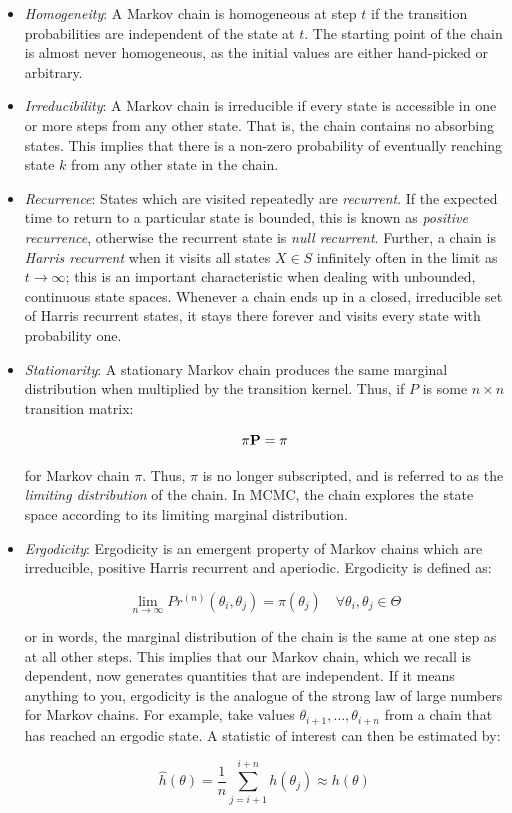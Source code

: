 \documentclass[]{book}
\begin{document}
\begin{itemize}
\item \emph{Homogeneity}: A Markov chain is homogeneous at step $t$ if the transition probabilities are independent of the state at $t$. The starting point of the chain is almost never homogeneous, as the initial values are either hand-picked or arbitrary.
\item \emph{Irreducibility}: A Markov chain is irreducible if every state is accessible in one or more steps from any other state. That is, the chain contains no absorbing states. This implies that there is a non-zero probability of eventually reaching state $k$ from any other state in the chain.
\item \emph{Recurrence}: States which are visited repeatedly are \emph{recurrent}. If the expected time to return to a particular state is bounded, this is known as \emph{positive recurrence}, otherwise the recurrent state is \emph{null recurrent}. Further, a chain is \emph{Harris recurrent} when it visits all states $X \in S$ infinitely often in the limit as $t \to \infty$; this is an important characteristic when dealing with unbounded, continuous state spaces. Whenever a chain ends up in a closed, irreducible set of Harris recurrent states, it stays there forever and visits every state with probability one.
\item \emph{Stationarity}: A stationary Markov chain produces the same marginal distribution when multiplied by the transition kernel.  Thus, if $P$ is some $n \times n$ transition matrix:

\[{\bf \pi P} = {\bf \pi}\]

\noindent for Markov chain $\pi$. Thus, $\pi$ is no longer subscripted, and is referred to as the \emph{limiting distribution} of the chain. In MCMC, the chain explores the state space according to its limiting marginal distribution.
\item \emph{Ergodicity}: Ergodicity is an emergent property of Markov chains which are irreducible, positive Harris recurrent and aperiodic. Ergodicity is defined as:

\[
\lim_{n \to \infty} Pr^{(n)}(\theta_i,\theta_j) = \pi(\theta_j) \quad \forall \theta_i, \theta_j \in \Theta
\]

\noindent or in words, the marginal distribution of the chain is the same at one step as at all other steps. This implies that our Markov chain, which we recall is dependent, now generates quantities that are independent. If it means anything to you, ergodicity is the analogue of the strong law of large numbers for Markov chains. For example, take values $\theta_{i+1},\ldots,\theta_{i+n}$ from a chain that has reached an ergodic state. A statistic of interest can then be estimated by:

\[
\hat{h}(\theta) = \frac{1}{n}\sum_{j=i+1}^{i+n} h(\theta_j) \approx h(\theta)
\]

\end{itemize}
\end{document}
